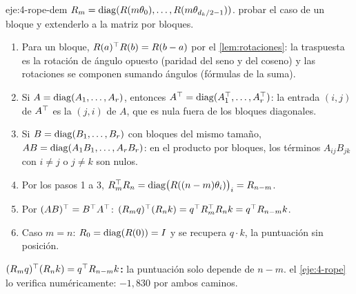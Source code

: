 \begin{solucion}{eje:4-rope-dem}
\datos $R_m=\operatorname{diag}(R(m\theta_0),\dots,R(m\theta_{d_k/2-1}))$.
\planteamiento probar el caso de un bloque y extenderlo a la matriz por bloques.
\pasos
\begin{enumerate}[label=\arabic*.]
  \item Para un bloque, $R(a)^{\top} R(b)=R(b-a)$ por el \cref{lem:rotaciones}: la traspuesta es la rotación de ángulo opuesto (paridad del seno y del coseno) y las rotaciones se componen sumando ángulos (fórmulas de la suma).
  \item Si $A=\operatorname{diag}(A_1,\dots,A_r)$, entonces $A^{\top}=\operatorname{diag}(A_1^{\top},\dots,A_r^{\top})$: la entrada $(i,j)$ de $A^{\top}$ es la $(j,i)$ de $A$, que es nula fuera de los bloques diagonales.
  \item Si $B=\operatorname{diag}(B_1,\dots,B_r)$ con bloques del mismo tamaño, $AB=\operatorname{diag}(A_1B_1,\dots,A_rB_r)$: en el producto por bloques, los términos $A_{ij}B_{jk}$ con $i\ne j$ o $j\ne k$ son nulos.
  \item Por los pasos 1 a 3, $R_m^{\top} R_n=\operatorname{diag}\bigl(R((n-m)\theta_i)\bigr)_i=R_{n-m}$.
  \item Por $(AB)^{\top}=B^{\top} A^{\top}$: $(R_mq)^{\top}(R_nk)=q^{\top} R_m^{\top} R_nk=q^{\top} R_{n-m}k$.
  \item Caso $m=n$: $R_0=\operatorname{diag}(R(0))=I$ y se recupera $q\cdot k$, la puntuación sin posición.
\end{enumerate}
\resultado \textbf{$(R_mq)^{\top}(R_nk)=q^{\top} R_{n-m}k$:} la puntuación solo depende de $n-m$.
\comprobacion el \cref{eje:4-rope} lo verifica numéricamente: $-1{,}830$ por ambos caminos.
\end{solucion}

